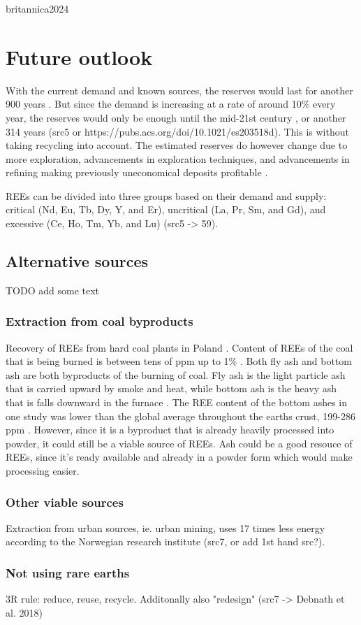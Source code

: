 britannica2024
\section{Future outlook}

With the current demand and known sources, the reserves would last for another 900 years \cite{britannica2024}. But since the demand is increasing at a rate of around 10\% every year, the reserves would only be enough until the mid-21st century \cite{britannica2024}, or another 314 years (src5 or https://pubs.acs.org/doi/10.1021/es203518d). This is without taking recycling into account. The estimated reserves do however change due to more exploration, advancements in exploration techniques, and advancements in refining making previously uneconomical deposits profitable \cite{REETechnology}.

REEs can be divided into three groups based on their demand and supply: critical (Nd, Eu,
Tb, Dy, Y, and Er), uncritical (La, Pr, Sm, and Gd), and excessive (Ce, Ho, Tm, Yb, and Lu) (src5 -> 59).

\subsection{Alternative sources}
TODO add some text

\subsubsection{Extraction from coal byproducts}

Recovery of REEs from hard coal plants in Poland \cite{USDoE2024}. Content of REEs of the coal that is being burned is between tens of ppm up to 1\% \cite{coalPoland}. Both fly ash and bottom ash are both byproducts of the burning of coal. Fly ash is the light particle ash that is carried upward by smoke and heat, while bottom ash is the heavy ash that is falls downward in the furnace \cite{ashPalmer}. The REE content of the bottom ashes in one study was lower than the global average throughout the earths crust, 199-286 ppm \cite{coalPoland}. However, since it is a byproduct that is already heavily processed into powder, it could still be a viable source of REEs. Ash could be a good resouce of REEs, since it's ready available and already in a powder form which would make processing easier.

\subsubsection{Other viable sources}

Extraction from urban sources, ie. urban mining, uses 17 times less energy according to the Norwegian research institute (src7, or add 1st hand src?).

\subsubsection{Not using rare earths}

3R rule: reduce, reuse, recycle. Additonally also "redesign" (src7 -> Debnath et al. 2018)


